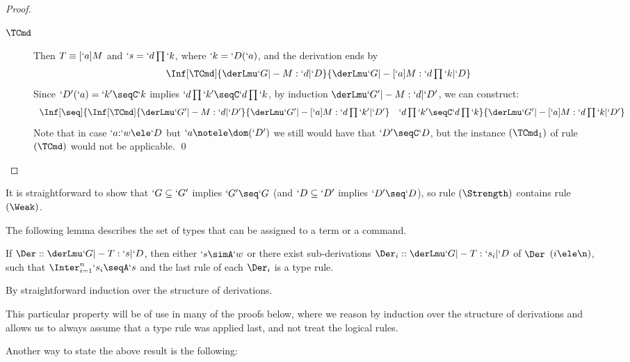\documentclass{lmcs}
\begin{document}
\begin{proof}
{\begin{description}
 \item [$ \TCmd $] 
Then $T\equiv [`a]M$ and $`s = `d\prod `k$, where $`k=`D(`a)$, and the derivation ends by
%
 \[ \begin{array}{c}
\Inf	[\TCmd]
	{\InfBox{ \derLmu `G |- M : `d | `D }
	}{ \derLmu `G |- [`a]M : `d\prod `k | `D }
 \end{array} \]
Since $`D'(`a)=`k'\seqC`k$ implies $`d\prod `k' \seqC `d\prod `k$, by induction $ \derLmu `G' |- M : `d | `D' $, we can construct:
%
 \[ \begin{array}{c}
\Inf	[\seq]
	{\Inf	[\TCmd]
{\InfBox{ \derLmu `G' |- M : `d | `D' }
}{ \derLmu `G' |- [`a]M : `d\prod `k' | `D' } 
	 \quad
	 \InfBox{`d\prod `k' \seqC `d\prod `k}
	}{ \derLmu `G' |- [`a]M : `d\prod `k | `D' }
 \end{array} \]
Note that in case $`a{:}`w\ele `D $ but $`a\notele \dom(`D')$ we still would have
that $`D'\seqC `D $, but the instance $(\TCmd_1)$ of rule $(\TCmd)$ would not be applicable.
 \qed

 \end{description}
} %
 \end{proof}
It is straightforward to show that $`G \subseteq `G'$ implies $`G' \seq `G$ (and $`D \subseteq `D'$ implies $`D' \seq `D$), so rule $(\Strength)$ contains rule $(\Weak)$.

The following lemma describes the set of types that can be assigned to a term or a command. 

 \begin{lem} \label{lem:logicalRules}
If $\Der :: \derLmu `G |- T : `s | `D $, then either $`s \simA `w$ or there exist sub-derivations $\Der_i :: \derLmu `G |- T : `s_i | `D $ of $\Der$ $(i \ele \n)$, such that $\Inter_{i=1}^n`s_i \seqA `s$ and the last rule of each $\Der_i$ is a type rule.
 \end{lem}

 \begin{Proof}
By straightforward induction over the structure of derivations. 
 \end{Proof}

This particular property will be of use in many of the proofs below, where we reason by induction over the structure of derivations and allows us to always assume that a type rule was applied last, and not treat the logical rules.

Another way to state the above result is the following:
\end{document}
